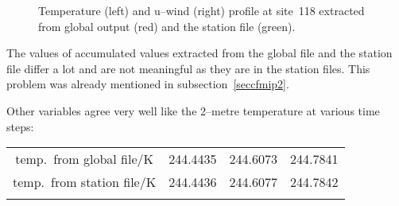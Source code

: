 \begin{appendix}
\begin{figure}
\caption{Temperature (left) and u--wind (right) profile at site~118 extracted
from global output (red) and the station file (green).}\label{figprofiles}
\end{figure}

The values of accumulated values extracted from the global file and
the station file differ a lot and are not meaningful as they are in
the station files. This problem was already mentioned in
subsection~\ref{seccfmip2}.

Other variables agree very well like the 2--metre temperature at
various time steps:

\begin{tabular*}{\textwidth}{cccc}
\\\hline
temp.~from global file/K &244.4435 &  244.6073 &  244.7841 \\
temp.~from station file/K &244.4436& 244.6077 & 244.7842 \\
\\\hline
\end{tabular*}

\clearpage\newpage


\clearpage\newpage


\end{appendix}
